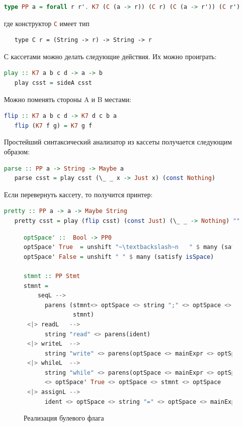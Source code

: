 \begin{lstlisting}[mathescape,language=Haskell]
  type PP a = forall r r'. K7 (C (a -> r)) (C r) (C (a -> r')) (C r')
\end{lstlisting}

\noindent где конструктор \lstinline[language=Haskell]{C} имеет тип 

\begin{lstlisting}
   type C r = (String -> r) -> String -> r
\end{lstlisting}

С кассетами можно делать следующие действия. Их можно проиграть:

\begin{lstlisting}[mathescape,language=Haskell]
   play :: K7 a b c d -> a -> b
   play csst = sideA csst
\end{lstlisting}

Можно поменять стороны A и B местами:

\begin{lstlisting}[mathescape,language=Haskell]
   flip :: K7 a b c d -> K7 d c b a
   flip (K7 f g) = K7 g f
\end{lstlisting}

Простейший синтаксический анализатор из кассеты получается следующим образом:

\begin{lstlisting}[mathescape,language=Haskell]
   parse :: PP a -> String -> Maybe a
   parse csst = play csst (\_ _ x -> Just x) (const Nothing)
\end{lstlisting}

Если перевернуть кассету, то получится принтер:

\begin{lstlisting}[mathescape,language=Haskell]
   pretty :: PP a -> a -> Maybe String
   pretty csst = play (flip csst) (const Just) (\_ _ -> Nothing) ""
\end{lstlisting}

\begin{figure}[ht]
\centering
\begin{lstlisting}[language=Haskell]
optSpace' ::  Bool -> PP0
optSpace' True  = unshift "~\textbackslash~n   " $ many (satisfy isSpace)
optSpace' False = unshift " " $ many (satisfy isSpace)

stmnt :: PP Stmt
stmnt = 
    seqL -->
      parens (stmnt<> optSpace <> string ";" <> optSpace <> 
              stmnt)
 <|> readL   -->
      string "read" <> parens(ident)
 <|> writeL  -->
      string "write" <> parens(optSpace <> mainExpr <> optSpace)
 <|> whileL  -->
      string "while" <> parens(optSpace <> mainExpr <> optSpace) 
      <> optSpace' True <> optSpace <> stmnt <> optSpace 
 <|> assignL --> 
      ident <> optSpace <> string "=" <> optSpace <> mainExpr  
\end{lstlisting}
\caption{Реализация булевого флага}
\label{boolFlag2}
\end{figure}

